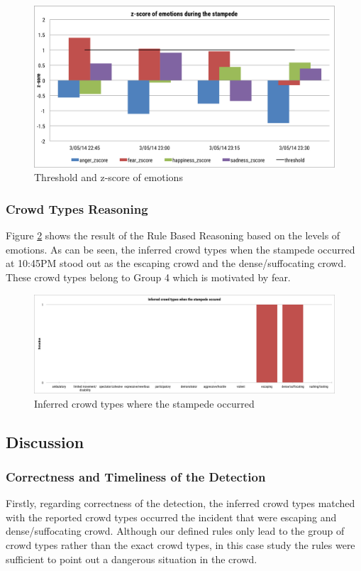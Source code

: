 \begin{figure}[htb!]
\centering
\includegraphics[width=1.0\textwidth]{EmotionZscoreFocus}
\caption{Threshold and z-score of emotions}
\label{fig:emotionZscoreFocus}
\end{figure}

\subsubsection{Crowd Types Reasoning}
Figure \ref{fig:crowdTypeStampede} shows the result of the Rule Based Reasoning based on the levels of emotions. As can be seen, the inferred crowd types when the stampede occurred at 10:45PM stood out as the escaping crowd and the dense/suffocating crowd. These crowd types belong to Group 4 which is motivated by fear.

\begin{figure}[htb!]
\centering
\includegraphics[width=1.0\textwidth]{CrowdTypeStampede}
\caption{Inferred crowd types where the stampede occurred}
\label{fig:crowdTypeStampede}
\end{figure}

\subsection{Discussion}

\subsubsection{Correctness and Timeliness of the Detection}
Firstly, regarding correctness of the detection, the inferred crowd types matched with the reported crowd types occurred the incident that were escaping and dense/suffocating crowd. Although our defined rules only lead to the group of crowd types rather than the exact crowd types, in this case study the rules were sufficient to point out a dangerous situation in the crowd.

